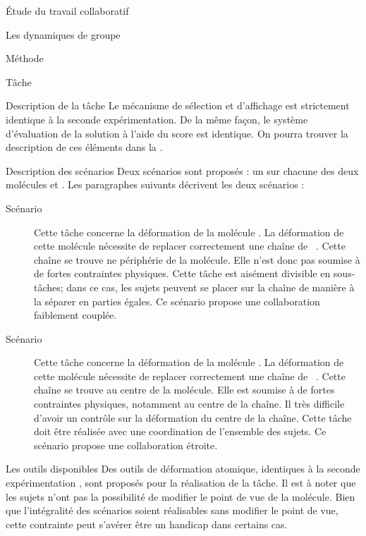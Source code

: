 \documentclass[myfrancais]{mythesis}
\begin{document}
\begin{mypart}{Étude du travail collaboratif}
\begin{mychapter}{Les dynamiques de groupe}
\begin{mysection}{Méthode}
\begin{mysubsection}{Tâche}
\begin{mysubsubsection}{Description de la tâche}
						Le mécanisme de sélection et d'affichage est strictement identique à la seconde expérimentation.
						De la même façon, le système d'évaluation de la solution à l'aide du score  est identique.
						On pourra trouver la description de ces éléments dans la .
					\end{mysubsubsection}
					\begin{mysubsubsection}{Description des scénarios}
						Deux scénarios sont proposés : un sur chacune des deux molécules \myPrion et \myUbiquitin.
						Les paragraphes suivants décrivent les deux scénarios :
						\begin{description}
							\item[Scénario~]
								Cette tâche concerne la déformation de la molécule \myPrion.
								La déformation de cette molécule nécessite de replacer correctement une chaîne de ~.
								Cette chaîne se trouve ne périphérie de la molécule.
								Elle n'est donc pas soumise à de fortes contraintes physiques.
								Cette tâche est aisément divisible en sous-tâches; dans ce cas, les sujets peuvent se placer sur la chaîne de manière à la séparer en parties égales.
								Ce scénario propose une collaboration faiblement couplée.
							\item[Scénario~]
								Cette tâche concerne la déformation de la molécule \myUbiquitin.
								La déformation de cette molécule nécessite de replacer correctement une chaîne de ~.
								Cette chaîne se trouve au centre de la molécule.
								Elle est soumise à de fortes contraintes physiques, notamment au centre de la chaîne.
								Il très difficile d'avoir un contrôle sur la déformation du centre de la chaîne.
								Cette tâche doit être réalisée avec une coordination de l'ensemble des sujets.
								Ce scénario propose une collaboration étroite.
						\end{description}
					\end{mysubsubsection}
					\begin{mysubsubsection}{Les outils disponibles}
						Des outils de déformation atomique, identiques à la seconde expérimentation , sont proposés pour la réalisation de la tâche.
						Il est à noter que les sujets n'ont pas la possibilité de modifier le point de vue de la molécule.
						Bien que l'intégralité des scénarios soient réalisables sans modifier le point de vue, cette contrainte peut s'avérer être un handicap dans certains cas.

\end{mysubsubsection}
\end{mysubsection}
\end{mysection}
\end{mychapter}
\end{mypart}
\end{document}
